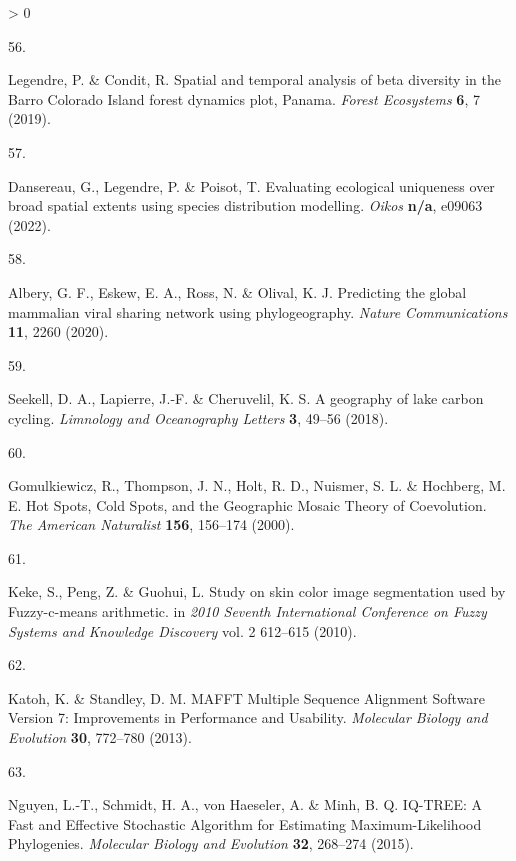 \documentclass[11pt]{article}
\newlength{\cslhangindent}
\newlength{\csllabelwidth}
\newenvironment{CSLReferences}[3] %
 {%
  \setlength{\parindent}{0pt}
  \ifodd #1 \everypar{\setlength{\hangindent}{\cslhangindent}}\ignorespaces\fi
  \ifnum #2 > 0
  \setlength{\parskip}{#2\baselineskip}
  \fi
 }%
 {}
\newcommand{\CSLLeftMargin}[1]{\parbox[t]{\maxof{\widthof{#1}}{\csllabelwidth}}{#1}}
\newcommand{\CSLRightInline}[1]{\parbox[t]{\linewidth}{#1}}
\begin{document}
\begin{CSLReferences}{0}{0}
\leavevmode\hypertarget{ref-Legendre2019SpaTem}{}%
\CSLLeftMargin{56. }
\CSLRightInline{Legendre, P. \& Condit, R. Spatial and temporal analysis
of beta diversity in the Barro Colorado Island forest dynamics plot,
Panama. \emph{Forest Ecosystems} \textbf{6}, 7 (2019).}

\leavevmode\hypertarget{ref-Dansereau2022EvaEco}{}%
\CSLLeftMargin{57. }
\CSLRightInline{Dansereau, G., Legendre, P. \& Poisot, T. Evaluating
ecological uniqueness over broad spatial extents using species
distribution modelling. \emph{Oikos} \textbf{n/a}, e09063 (2022).}

\leavevmode\hypertarget{ref-Albery2020PreGlo}{}%
\CSLLeftMargin{58. }
\CSLRightInline{Albery, G. F., Eskew, E. A., Ross, N. \& Olival, K. J.
Predicting the global mammalian viral sharing network using
phylogeography. \emph{Nature Communications} \textbf{11}, 2260 (2020).}

\leavevmode\hypertarget{ref-Seekell2018GeoLak}{}%
\CSLLeftMargin{59. }
\CSLRightInline{Seekell, D. A., Lapierre, J.-F. \& Cheruvelil, K. S. A
geography of lake carbon cycling. \emph{Limnology and Oceanography
Letters} \textbf{3}, 49--56 (2018).}

\leavevmode\hypertarget{ref-Gomulkiewicz2000HotSpo}{}%
\CSLLeftMargin{60. }
\CSLRightInline{Gomulkiewicz, R., Thompson, J. N., Holt, R. D., Nuismer,
S. L. \& Hochberg, M. E. Hot Spots, Cold Spots, and the Geographic
Mosaic Theory of Coevolution. \emph{The American Naturalist}
\textbf{156}, 156--174 (2000).}

\leavevmode\hypertarget{ref-Keke2010StuSki}{}%
\CSLLeftMargin{61. }
\CSLRightInline{Keke, S., Peng, Z. \& Guohui, L. Study on skin color
image segmentation used by Fuzzy-c-means arithmetic. in \emph{2010
Seventh International Conference on Fuzzy Systems and Knowledge
Discovery} vol. 2 612--615 (2010).}

\leavevmode\hypertarget{ref-Katoh2013MafMul}{}%
\CSLLeftMargin{62. }
\CSLRightInline{Katoh, K. \& Standley, D. M. MAFFT Multiple Sequence
Alignment Software Version 7: Improvements in Performance and Usability.
\emph{Molecular Biology and Evolution} \textbf{30}, 772--780 (2013).}

\leavevmode\hypertarget{ref-Nguyen2015IqtFas}{}%
\CSLLeftMargin{63. }
\CSLRightInline{Nguyen, L.-T., Schmidt, H. A., von Haeseler, A. \& Minh,
B. Q. IQ-TREE: A Fast and Effective Stochastic Algorithm for Estimating
Maximum-Likelihood Phylogenies. \emph{Molecular Biology and Evolution}
\textbf{32}, 268--274 (2015).}


\end{CSLReferences}
\end{document}
